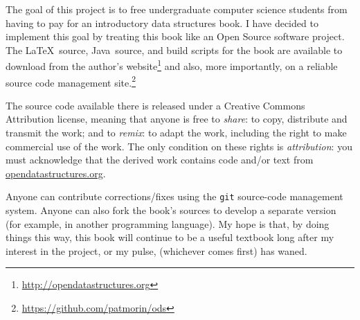 \documentclass[10pt]{book}
\newcommand{\cpponly}[1]{}\newcommand{\javaonly}[1]{#1}\newcommand{\pcodeonly}[1]{}\newcommand{\notpcode}[1]{#1}\newcommand{\lang}{Java}
\theoremstyle{plain}
\theoremstyle{definition}
\begin{document}
The goal of this project is to free undergraduate computer science
students from having to pay for an introductory data structures book.
I have decided to implement this goal by treating this book like an
Open Source
software project.  The \LaTeX\ source, \lang\ source, and
build scripts for the book are available to download from the
author's website\footnote{\url{http://opendatastructures.org}}
and also, more importantly, on a reliable source code management
site.\footnote{\url{https://github.com/patmorin/ods}}

The source code available there is released under a Creative Commons
Attribution license, meaning that anyone is free to \emph{share}:
to copy, distribute and
transmit the work; and to \emph{remix}:
to adapt the work, including the
right to make commercial use of the work.  The only condition on these
rights is \emph{attribution}: you must acknowledge that the derived work
contains code and/or text from \url{opendatastructures.org}.

Anyone can contribute corrections/fixes using the \texttt{git}
source-code management system.  Anyone can also fork the book's sources to
develop a separate version (for example, in another programming language).
My hope is that, by doing things this way, this book will continue to
be a useful textbook long after my interest in the project, or my pulse,
(whichever comes first) has waned.



\clearpage

\cleardoublepage

\cpponly{
  \clearpage
\cpponly{
\chapter*{Preface to the C++ Edition}
\addcontentsline{toc}{chapter}{Preface to the C++ Edition}

This book is intended to teach the design and analysis of basic data
structures and their implementation in an object-oriented language.
In this edition, the language happens to be C++.

This book is not intended to act as an introduction to the C++ programming
language.  Readers of this book need only be familiar with the basic
syntax of C++ and similar languages.  Those wishing to work with the
accompanying source code should have some experience programming in C++.

This book is also not intended as an introduction to the C++ Standard
Template Library or the generic programming paradigm that the STL
embodies.  This book describes implementations of several different data
structures, many of which are used in implementations of the STL. The
contents of this book may help an STL programmer understand how some of
the STL data structures are implemented and why these implementations
are efficient.
}

\clearpage

  \cleardoublepage
}
\end{document}
